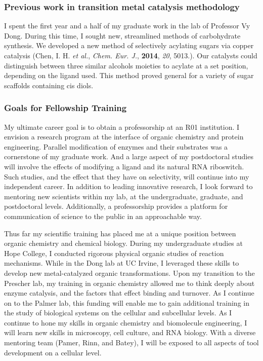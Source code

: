 \documentclass{F32}
\begin{document}
\subsubsection*{Previous work in transition metal catalysis methodology}
I spent the first year and a half of my graduate work in the lab of Professor Vy Dong. During this time, I sought new, streamlined methods of carbohydrate synthesis. We developed a new method of selectively acylating sugars via copper catalysis (Chen, I. H. \textit{et al.}, \textit{Chem. Eur. J.}, \textbf{2014}, \textit{20}, 5013.). Our catalysts could distinguish between three similar alcohols moieties to acylate at a set position, depending on the ligand used. This method proved general for a variety of sugar scaffolds containing cis diols.

\subsubsection*{Goals for Fellowship Training}
My ultimate career goal is to obtain a professorship at an R01 institution. I envision a research program at the interface of organic chemistry and protein engineering. Parallel modification of enzymes and their substrates was a cornerstone of my graduate work. And a large aspect of my postdoctoral studies will involve the effects of modifying a ligand and its natural RNA riboswitch. Such studies, and the effect that they have on selectivity, will continue into my independent career. In addition to leading innovative research, I look forward to mentoring new scientists within my lab, at the undergraduate, graduate, and postdoctoral levels. Additionally, a professorship provides a platform for communication of science to the public in an approachable way.

Thus far my scientific training has placed me at a unique position between organic chemistry and chemical biology. During my undergraduate studies at Hope College, I conducted rigorous physical organic studies of reaction mechanisms. While in the Dong lab at UC Irvine, I leveraged these skills to develop new metal-catalyzed organic transformations. Upon my transition to the Prescher lab, my training in organic chemistry allowed me to think deeply about enzyme catalysis, and the factors that effect binding and turnover. As I continue on to the Palmer lab, this funding will enable me to gain additional training in the study of biological systems on the cellular and subcellular levels. As I continue to hone my skills in organic chemistry and biomolecule engineering, I will learn new skills in microscopy, cell culture, and RNA biology. With a diverse mentoring team (Pamer, Rinn, and Batey), I will be exposed to all aspects of tool development on a cellular level.
\end{document}
